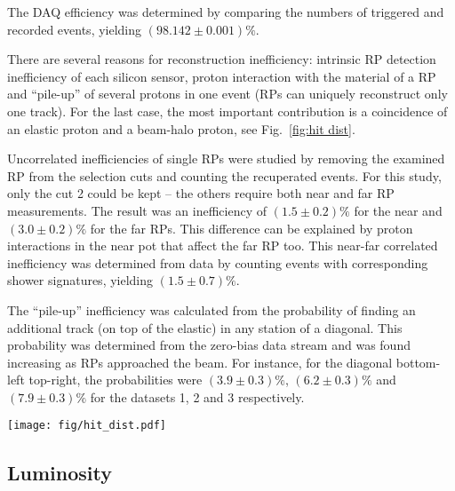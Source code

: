 \documentclass[doublecol]{../macros/epl2}
\def\un#1{\,{\rm #1}}
\begin{document}
The DAQ efficiency was determined by comparing the numbers of triggered and recorded events, yielding $(98.142 \pm 0.001)\%$.

There are several reasons for reconstruction inefficiency: intrinsic RP detection inefficiency of each silicon sensor, proton interaction with the material of a RP and ``pile-up'' of several protons in one event (RPs can uniquely reconstruct only one track). For the last case, the most important contribution is a coincidence of an elastic proton and a beam-halo proton, see Fig.~\ref{fig:hit dist}.

Uncorrelated inefficiencies of single RPs were studied by removing the examined RP from the selection cuts and counting the recuperated events. For this study, only the cut 2 could be kept -- the others require both near and far RP measurements. The result was an inefficiency of $(1.5 \pm 0.2)\%$ for the near and $(3.0 \pm 0.2)\%$ for the far RPs. This difference can be explained by proton interactions in the near pot that affect the far RP too. This near-far correlated inefficiency was determined from data by counting events with corresponding shower signatures, yielding $(1.5\pm 0.7)\%$.

The ``pile-up'' inefficiency was calculated from the probability of finding an additional track (on top of the elastic) in any station of a diagonal. This probability was determined from the zero-bias data stream and was found increasing as RPs approached the beam. For instance, for the diagonal bottom-left top-right, the probabilities were $(3.9 \pm 0.3)\%$, $(6.2 \pm 0.3)\%$ and $(7.9 \pm 0.3)\%$ for the datasets 1, 2 and 3 respectively.


\begin{figure*}
\begin{center}
\texttt{[image: fig/hit\_dist.pdf]}
\vskip-5mm
\caption{Hit distributions from dataset 3 in the far unit of the $220\un{m}$ station, right arm. Left: with diagonal cut only, Right: with all the elastic selection cuts (see Tab.~\ref{tab:cuts}). The left plot clearly indicates the presence of the beam halo, which is eliminated by the selection cuts (the right plot). The distribution of elastic hits in the right plot is sharply cut at about $|y| = 29\un{mm}$ as a consequence of the LHC aperture limitations. }
\label{fig:hit dist}
\end{center}
\end{figure*}

\subsection{Luminosity}
\end{document}
